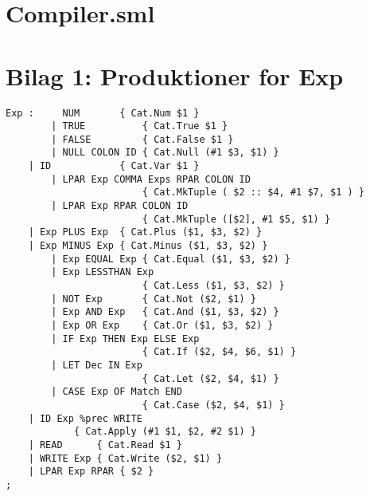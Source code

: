 \documentclass [10pt,a4paper]{article}
\begin{document}
\section{Compiler.sml}

\newpage 

\section{Bilag 1: Produktioner for Exp}

\begin{lstlisting}[frame=single,language=Clean]    
Exp :	  NUM		{ Cat.Num $1 }
        | TRUE          { Cat.True $1 }
        | FALSE         { Cat.False $1 }
        | NULL COLON ID { Cat.Null (#1 $3, $1) }
	| ID            { Cat.Var $1 }
        | LPAR Exp COMMA Exps RPAR COLON ID
                        { Cat.MkTuple ( $2 :: $4, #1 $7, $1 ) }
        | LPAR Exp RPAR COLON ID 
                        { Cat.MkTuple ([$2], #1 $5, $1) }
	| Exp PLUS Exp	{ Cat.Plus ($1, $3, $2) }
	| Exp MINUS Exp	{ Cat.Minus ($1, $3, $2) }
        | Exp EQUAL Exp { Cat.Equal ($1, $3, $2) }
        | Exp LESSTHAN Exp
                        { Cat.Less ($1, $3, $2) }
        | NOT Exp       { Cat.Not ($2, $1) }
        | Exp AND Exp   { Cat.And ($1, $3, $2) }
        | Exp OR Exp    { Cat.Or ($1, $3, $2) }
        | IF Exp THEN Exp ELSE Exp
                        { Cat.If ($2, $4, $6, $1) }
        | LET Dec IN Exp
                        { Cat.Let ($2, $4, $1) }
        | CASE Exp OF Match END
                        { Cat.Case ($2, $4, $1) }
	| ID Exp %prec WRITE
			{ Cat.Apply (#1 $1, $2, #2 $1) }
	| READ		{ Cat.Read $1 }
	| WRITE Exp	{ Cat.Write ($2, $1) }
	| LPAR Exp RPAR { $2 }
;
\end{lstlisting}
\end{document}
